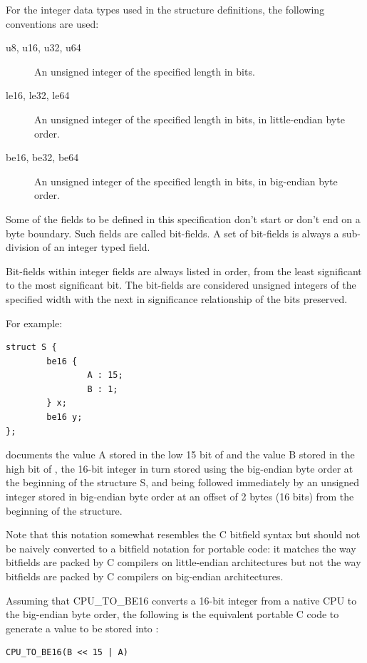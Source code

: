 For the integer data types used in the structure definitions, the following
conventions are used:

\begin{description}
\item[u8, u16, u32, u64] An unsigned integer of the specified length in bits.

\item[le16, le32, le64] An unsigned integer of the specified length in bits,
in little-endian byte order.

\item[be16, be32, be64] An unsigned integer of the specified length in bits,
in big-endian byte order.
\end{description}

Some of the fields to be defined in this specification don't
start or don't end on a byte boundary. Such fields are called bit-fields.
A set of bit-fields is always a sub-division of an integer typed field.

Bit-fields within integer fields are always listed in order,
from the least significant to the most significant bit.  The
bit-fields are considered unsigned integers of the specified
width with the next in significance relationship of the bits
preserved.

For example:
\begin{lstlisting}
struct S {
        be16 {
                A : 15;
                B : 1;
        } x;
        be16 y;
};
\end{lstlisting}
documents the value A stored in the low 15 bit of  and
the value B stored in the high bit of , the 16-bit
integer  in turn stored using the big-endian byte order
at the beginning of the structure S,
and being followed immediately by an unsigned integer 
stored in big-endian byte order at an offset of 2 bytes (16 bits)
from the beginning of the structure.

Note that this notation somewhat resembles the C bitfield syntax but
should not be naively converted to a bitfield notation for portable
code: it matches the way bitfields are packed by C compilers on
little-endian architectures but not the way bitfields are packed by C
compilers on big-endian architectures.

Assuming that CPU_TO_BE16 converts a 16-bit integer from a native
CPU to the big-endian byte order, the following is the equivalent
portable C code to generate a value to be stored into :
\begin{lstlisting}
CPU_TO_BE16(B << 15 | A)
\end{lstlisting}
